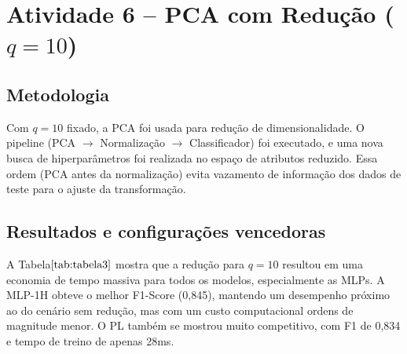 \documentclass[11pt,a4paper]{article}
\begin{document}
\section{Atividade 6 – PCA com Redução (\(q=10\))}

\subsection{Metodologia}

Com \(q=10\) fixado, a PCA foi usada para redução de dimensionalidade. O pipeline (PCA \(\rightarrow\) Normalização \(\rightarrow\) Classificador) foi executado, e uma nova busca de hiperparâmetros foi realizada no espaço de atributos reduzido. Essa ordem (PCA antes da normalização) evita vazamento de informação dos dados de teste para o ajuste da transformação.

\subsection{Resultados e configurações vencedoras}

A Tabela\(\ref{tab:tabela3}\) mostra que a redução para \(q=10\) resultou em uma economia de tempo massiva para todos os modelos, especialmente as MLPs. A MLP-1H obteve o melhor F1-Score (0,845), mantendo um desempenho próximo ao do cenário sem redução, mas com um custo computacional ordens de magnitude menor. O PL também se mostrou muito competitivo, com F1 de 0,834 e tempo de treino de apenas 28ms.

\begin{table}[h!]
  \centering
  \caption{Resultados médios da Atividade 6 (PCA com \(q=10\)).}
  \label{tab:tabela3}
\end{table}
\end{document}
